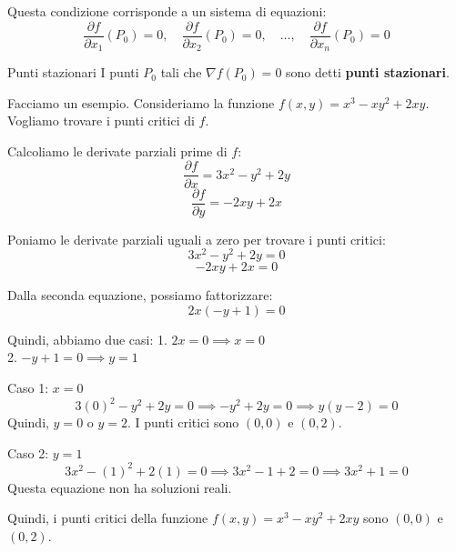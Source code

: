 \begin{osservazione}{}
  Questa condizione corrisponde a un sistema di equazioni:
  \[
  \frac{\partial f}{\partial x_1}(P_0) = 0, \quad \frac{\partial f}{\partial x_2}(P_0) = 0, \quad \dots, \quad \frac{\partial f}{\partial x_n}(P_0) = 0
  \]
\end{osservazione}

\begin{definizione}{Punti stazionari}
  I punti $P_0$ tali che $\nabla f(P_0) = 0$ sono detti \textbf{punti stazionari}.
\end{definizione}

Facciamo un esempio.
Consideriamo la funzione $f(x,y) = x^3 - xy^2 + 2xy$. Vogliamo trovare i punti critici di $f$.

Calcoliamo le derivate parziali prime di $f$:
\[
\frac{\partial f}{\partial x} = 3x^2 - y^2 + 2y
\]
\[
\frac{\partial f}{\partial y} = -2xy + 2x
\]

Poniamo le derivate parziali uguali a zero per trovare i punti critici:
\[
3x^2 - y^2 + 2y = 0
\]
\[
-2xy + 2x = 0
\]

Dalla seconda equazione, possiamo fattorizzare:
\[
2x(-y + 1) = 0
\]

Quindi, abbiamo due casi:
1. $2x = 0 \implies x = 0$\\
2. $-y + 1 = 0 \implies y = 1$

Caso 1: $x = 0$
\[
3(0)^2 - y^2 + 2y = 0 \implies -y^2 + 2y = 0 \implies y(y - 2) = 0
\]
Quindi, $y = 0$ o $y = 2$. I punti critici sono $(0,0)$ e $(0,2)$.

Caso 2: $y = 1$
\[
3x^2 - (1)^2 + 2(1) = 0 \implies 3x^2 - 1 + 2 = 0 \implies 3x^2 + 1 = 0
\]
Questa equazione non ha soluzioni reali.

Quindi, i punti critici della funzione $f(x,y) = x^3 - xy^2 + 2xy$ sono $(0,0)$ e $(0,2)$.\\

